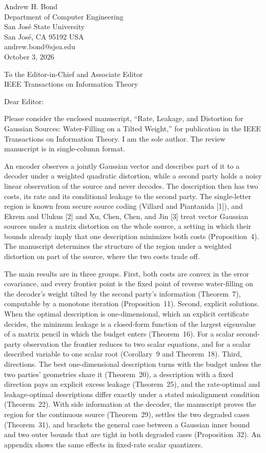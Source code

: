 \documentclass[11pt]{article}
\begin{document}
\begin{flushright}
Andrew H. Bond\\
Department of Computer Engineering\\
San Jos\'e State University\\
San Jos\'e, CA 95192 USA\\
andrew.bond@sjsu.edu\\[0.8em]
October 3, 2026
\end{flushright}

To the Editor-in-Chief and Associate Editor\\
IEEE Transactions on Information Theory

Dear Editor:

Please consider the enclosed manuscript, ``Rate, Leakage, and Distortion
for Gaussian Sources: Water-Filling on a Tilted Weight,'' for publication
in the IEEE Transactions on Information Theory. I am the sole author. The
review manuscript is in single-column format.

An encoder observes a jointly Gaussian vector and describes part of it to
a decoder under a weighted quadratic distortion, while a second party
holds a noisy linear observation of the source and never decodes. The
description then has two costs, its rate and its conditional leakage to
the second party. The single-letter region is known from secure source
coding (Villard and Piantanida [1]), and Ekrem and Ulukus [2] and Xu, Chen,
Chen, and Jin [3] treat vector Gaussian sources under a matrix distortion
on the whole source, a setting in which their bounds already imply that
one description minimizes both costs (Proposition~4). The manuscript
determines the structure of the region under a weighted distortion on
part of the source, where the two costs trade off.

The main results are in three groups. First, both costs are convex in the
error covariance, and every frontier point is the fixed point of reverse
water-filling on the decoder's weight tilted by the second party's
information (Theorem~7), computable by a monotone iteration
(Proposition~11). Second, explicit solutions. When the optimal
description is one-dimensional, which an explicit certificate decides,
the minimum leakage is a closed-form function of the largest eigenvalue
of a matrix pencil in which the budget enters (Theorem~16). For a scalar
second-party observation the frontier reduces to two scalar equations,
and for a scalar described variable to one scalar root (Corollary~9 and
Theorem~18). Third, directions. The best one-dimensional description
turns with the budget unless the two parties' geometries share it
(Theorem~20), a description with a fixed direction pays an explicit
excess leakage (Theorem~25), and the rate-optimal and leakage-optimal
descriptions differ exactly under a stated misalignment condition
(Theorem~22). With side information at the decoder, the manuscript
proves the region for the continuous source (Theorem~29), settles the two
degraded cases (Theorem~31), and brackets the general case between a
Gaussian inner bound and two outer bounds that are tight in both
degraded cases (Proposition~32). An appendix shows the same effects in
fixed-rate scalar quantizers.
\end{document}
